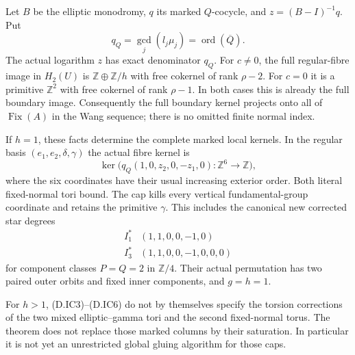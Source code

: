 Let $B$ be the elliptic monodromy, $q$ its marked
$Q$-cocycle, and $z=(B-I)^{-1}q$. Put
\[
        q_Q=\gcd_j(l_j\mu_j)
             =\operatorname{ord}(\overline Q).
                                                        \tag{D.IC6}
\]
The actual logarithm $z$ has exact denominator $q_Q$.
For $c\ne0$, the full regular-fibre image in $H_2(U)$
is $\mathbb Z\oplus\mathbb Z/h$ with free cokernel
of rank $\rho-2$. For $c=0$ it is a primitive
$\mathbb Z^2$ with free cokernel of rank $\rho-1$.
In both cases this is already the full boundary image.
Consequently the full boundary kernel projects onto
all of $\operatorname{Fix}(A)$ in the Wang sequence;
there is no omitted finite normal index.

If $h=1$, these facts determine the complete marked
local kernels. In the regular basis
$(e_1,e_2,\delta,\gamma)$ the actual fibre kernel is
\[
 \ker\bigl(q_Q(1,0,z_2,0,-z_1,0):\mathbb Z^6\to\mathbb Z\bigr),
                                                        \tag{D.IC7}
\]
where the six coordinates have their usual increasing
exterior order. Both literal fixed-normal tori bound.
The cap kills every vertical fundamental-group
coordinate and retains the primitive $\gamma$.
This includes the canonical new corrected star degrees
\[
 \begin{array}{c|c}
 I_1^*&(1,1,0,0,-1,0)\\
 I_3^*&(1,1,0,0,-1,0,0,0)
 \end{array}
                                                        \tag{D.IC8}
\]
for component classes $P=Q=2$ in $\mathbb Z/4$.
Their actual permutation has two paired outer orbits
and fixed inner components, and $g=h=1$.

For $h>1$, (D.IC3)--(D.IC6) do not by themselves specify
the torsion corrections of the two mixed
elliptic--gamma tori and the second fixed-normal torus.
The theorem does not replace those marked columns by
their saturation. In particular it is not yet an
unrestricted global gluing algorithm for those caps.

